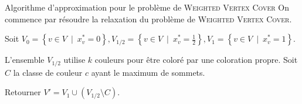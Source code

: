 \begin{styledalgo}{Algorithme d'approximation pour le problème de \textsc{Weighted Vertex Cover}}
    \State On commence par résoudre la relaxation du problème de \textsc{Weighted Vertex Cover}. %

    \State Soit \(V_0 = \left\{v \in V\ \mid\ x^\ast_v = 0\right\}, V_{1/2} = \left\{v \in V\ \mid\ x^\ast_v = \frac{1}{2}\right\}, V_1 = \left\{v \in V\ \mid\ x^\ast_v = 1\right\}\). %

    \State L'ensemble \(V_{1/2}\) utilise \(k\) couleurs pour être coloré par une coloration propre. %
    Soit \(C\) la classe de couleur \(c\) ayant le maximum de sommets.

    \State Retourner \(V' = V_1 \cup (V_{1/2} \setminus C)\). %
\end{styledalgo}